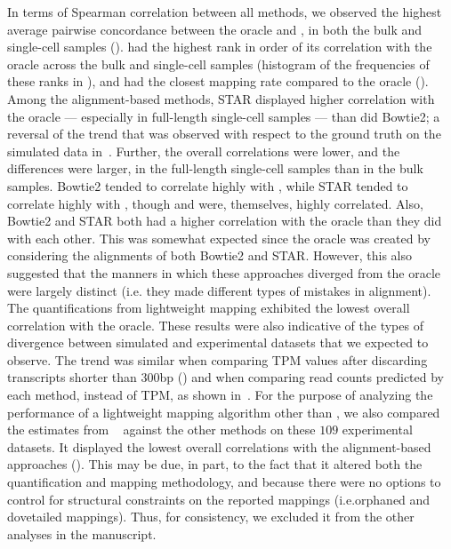 In terms of Spearman correlation between all methods, we observed the
  highest average pairwise concordance between the oracle and \saf, 
  in both the bulk and single-cell samples ().
  \saf had the highest rank in order of its correlation with the
  oracle across the bulk and single-cell samples (histogram of the
  frequencies of these ranks in ), and had the closest
  mapping rate compared to the oracle ().
  Among the alignment-based methods, 
  STAR displayed higher correlation with the oracle --- especially in full-length single-cell
  samples --- than did Bowtie2; a reversal of the trend that was observed 
  with respect to the ground truth on the simulated data in~.
  Further, the overall correlations were lower, and the differences were larger, in the full-length
  single-cell samples than in the bulk samples.  Bowtie2 tended to correlate highly with \hsa, while
  STAR tended to correlate highly with \saf, though \hsa and \saf were, themselves, highly correlated.
  Also, Bowtie2 and STAR both had a higher correlation with the oracle than they did with each other.
  This was somewhat expected since the oracle was created by considering the alignments of both Bowtie2 and 
  STAR.  However, this also suggested that the manners in which these approaches diverged from the oracle 
  were largely distinct (i.e. they made different types of mistakes in alignment).
  The quantifications from lightweight mapping exhibited the lowest overall correlation with the oracle. 
  These results were also indicative of the types of divergence between simulated and
  experimental datasets that we expected to observe. The trend was similar when
  comparing TPM values after discarding transcripts shorter than $300$bp
  () and when comparing read counts predicted by each
  method, instead of TPM, as shown in~. For the
    purpose of analyzing the performance of a lightweight mapping algorithm
    other than \qm, we also compared the estimates from
    \kallisto~\citep{kallisto} against the other methods on these $109$
    experimental datasets. It displayed the lowest overall correlations with the
    alignment-based approaches (). This may be due, in part,
    to the fact that it altered both the quantification and mapping methodology,
    and because there were no options to control for structural constraints on
    the reported mappings (i.e.\@ orphaned and dovetailed mappings). Thus, for
    consistency, we excluded it from the other analyses in the
    manuscript.

